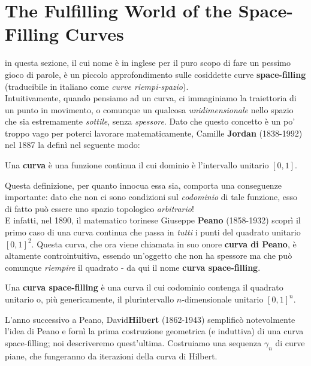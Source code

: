 \section{The Fulfilling World of the Space-Filling Curves}
in questa sezione, il cui nome è in inglese per il puro scopo di fare un pessimo gioco di parole, è un piccolo approfondimento sulle cosiddette curve \textbf{space-filling} (traducibile in italiano come \textit{curve riempi-spazio}).\\
Intuitivamente, quando pensiamo ad un curva, ci immaginiamo la traiettoria di un punto in movimento, o comunque un qualcosa \textit{unidimensionale} nello spazio che sia estremamente \textit{sottile}, senza \textit{spessore}. Dato che questo concetto è un po' troppo vago per poterci lavorare matematicamente, Camille \textbf{Jordan} (1838-1992) nel 1887 la definì nel seguente modo:
\begin{define}[Curva]
	Una \textbf{curva} è una funzione continua il cui dominio è l'intervallo unitario $\left[0,1\right]$.
\end{define}
Questa definizione, per quanto innocua essa sia, comporta una conseguenze importante: dato che non ci sono condizioni sul \textit{codominio} di tale funzione, esso di fatto può essere uno spazio topologico \textit{arbitrario}!\\
E infatti, nel 1890, il matematico torinese Giuseppe \textbf{Peano} (1858-1932) scoprì il primo caso di una curva continua che passa in \textit{tutti} i punti del quadrato unitario $\left[0,1\right]^2$. Questa curva, che ora viene chiamata in suo onore \textbf{curva di Peano}, è altamente controintuitiva, essendo un'oggetto che non ha spessore ma che può comunque \textit{riempire} il quadrato - da qui il nome \textbf{curva space-filling}.
\begin{define}
	Una \textbf{curva space-filling} è una curva il cui codominio contenga il quadrato unitario o, più genericamente, il plurintervallo $n$-dimensionale unitario $\left[0,1\right]^n$.
\end{define}
L'anno successivo a Peano, David\textbf{Hilbert} (1862-1943) semplificò notevolmente l'idea di Peano e fornì la prima costruzione geometrica (e induttiva) di una curva space-filling; noi descriveremo quest'ultima. Costruiamo una sequenza $\gamma_n$ di curve piane, che fungeranno da iterazioni della curva di Hilbert.
